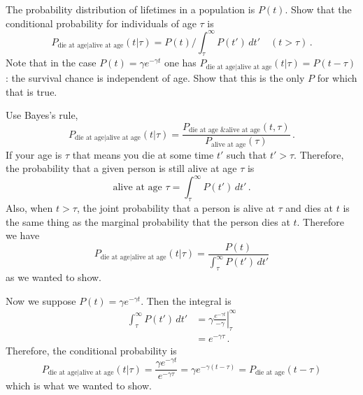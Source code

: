 

The probability distribution of lifetimes in a population is $P(t)$.
Show that the conditional probability for individuals of age $\tau$ is
\begin{equation*}
P_{\text{die at age}|\text{alive at age}}(t | \tau) = P(t) / \int_\tau^\infty P(t') \, dt' \quad (t > \tau) \, .
\end{equation*}
Note that in the case $P(t) = \gamma e^{-\gamma t}$ one has $P_{\text{die at age}|\text{alive at age}}(t|\tau) = P(t - \tau)$: the survival chance is independent of age.
Show that this is the only $P$ for which that is true.


Use Bayes's rule,
\begin{equation*}
P_{\text{die at age}|\text{alive at age}}(t | \tau)
= \frac{P_{\text{die at age \& alive at age}}(t, \tau)}{P_{\text{alive at age}}(\tau)} \, .
\end{equation*}
If your age is $\tau$ that means you die at some time $t'$ such that $t' > \tau$.
Therefore, the probability that a given person is still alive at age $\tau$ is
\begin{equation*}
\text{alive at age }\tau = \int_\tau^\infty P(t') \, dt' \, .
\end{equation*}
Also, when $t > \tau$, the joint probability that a person is alive at $\tau$ and dies at $t$ is the same thing as the marginal probability that the person dies at $t$.
Therefore we have
\begin{equation*}
P_{\text{die at age}|\text{alive at age}}(t | \tau)
= \frac{P(t)}{\int_\tau^\infty P(t') \, dt'}
\end{equation*}
as we wanted to show.

Now we suppose $P(t) = \gamma e^{-\gamma t}$.
Then the integral is
\begin{align*}
\int_\tau^\infty P(t') \, dt'
&= \gamma \left. \frac{e^{-\gamma t}}{-\gamma} \right|_\tau^\infty \\
&= e^{-\gamma \tau} \, .
\end{align*}
Therefore, the conditional probability is
\begin{equation*}
P_{\text{die at age}|\text{alive at age}}(t | \tau)
= \frac{\gamma e^{-\gamma t}}{e^{-\gamma \tau}} = \gamma e^{-\gamma (t - \tau)}
= P_\text{die at age} ( t - \tau)
\end{equation*}
which is what we wanted to show.

